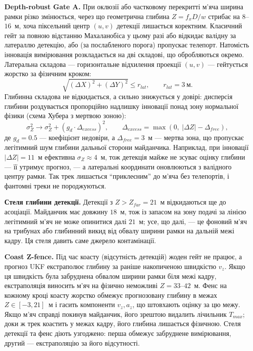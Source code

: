 \textbf{Depth-robust Gate A.} При оклюзії або частковому перекритті м'яча ширина
рамки різко змінюється, через що геометрична глибина $Z = f_x D / w$ стрибає на
$8$--$16$~м, хоча піксельний центр $(u, v)$ детекції лишається коректним.
Класичний гейт за повною відстанню Махаланобіса у цьому разі або відкидає валідну
за латераллю детекцію, або (за послабленого порога) пропускає телепорт. Натомість
інновація вимірювання розкладається на дві складові, що обробляються окремо.
Латеральна складова --- горизонтальне відхилення проекції $(u, v)$ ---
гейтується жорстко за фізичним кроком:
\begin{equation}\sqrt{(\Delta X)^2 + (\Delta Y)^2} \le r_{lat},\qquad r_{lat} = 3~\text{м}.\end{equation}
Глибинна складова не відкидається, а сильно знижується у довірі: дисперсія
глибини роздувається пропорційно надлишку інновації понад зону нормальної фізики
(схема Хубера з мертвою зоною):
\begin{equation}\sigma_Z^{2}\rightarrow \sigma_Z^{2} + (g_d \cdot \Delta_{excess})^2,\qquad
\Delta_{excess} = \max\!\left(0,\; |\Delta Z| - \Delta_{free}\right),\end{equation}
де $g_d = 0.5$ --- коефіцієнт недовіри, а $\Delta_{free} = 3$~м --- мертва зона,
що пропускає легітимний шум глибини дальньої сторони майданчика. Наприклад, при
інновації $|\Delta Z| = 11$~м ефективна $\sigma_Z \approx 4$~м, тож детекція
майже не зсуває оцінку глибини --- її утримує прогноз, --- а латеральні
координати оновлюються з валідного центру рамки. Так трек лишається
``приклеєним'' до м'яча без телепортів, і фантомні треки не породжуються.

\textbf{Стеля глибини детекції.} Детекції з $Z > Z_{far} = 21$~м відкидаються ще
до асоціації. Майданчик має довжину $18$~м, тож із запасом на зону подачі за
лінією легітимний м'яч не може опинитися далі $21$~м; усе, що далі, --- це
фоновий м'яч на трибунах або глибинний викид від обвалу ширини рамки на дальній
межі кадру. Ця стеля давить саме джерело контамінації.

\textbf{Coast Z-fence.} Під час коасту (відсутність детекцій) жоден гейт не
працює, а прогноз \gls{UKF} екстраполює глибину за раніше накопиченою швидкістю
$v_z$. Якщо ця швидкість була забруднена обвалом ширини рамки біля межі кадру,
екстраполяція виносить м'яч на фізично неможливі $Z = 33$--$42$~м. Фенс на
кожному кроці коасту жорстко обмежує прогнозовану глибину в межах
$Z \in [-3, 21]$~м і гасить компоненти $v_z, a_z$, що штовхають оцінку за цю
межу. Якщо м'яч справді покинув майданчик, його зрештою видалить лічильник
$T_{max}$; доки ж трек коастить у межах кадру, його глибина лишається фізичною.
Стеля детекції та фенс діють узгоджено: перша обмежує забруднене вимірювання,
другий --- екстраполяцію за його відсутності.


